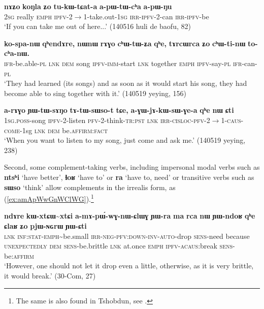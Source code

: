 \documentclass[oneside,a4paper,11pt]{article}
\newcommand{\ipa}[1]{\textbf{\phon#1}} %
\newcommand{\jpg}[2]{\ipa{#1} `#2'} %
\newcommand{\tld}{\textasciitilde{}}
\begin{document}
\begin{exe}
\ex \label{ex:tukWtɕata}
\gll 
\ipa{nɤʑo} 	\ipa{koŋla} 	\ipa{ʑo} 	\ipa{tu-kɯ-tɕat-a} 	\ipa{a-pɯ-tɯ-cʰa} 	\ipa{a-pɯ-ŋu} 	\\
\textsc{2sg} really \textsc{emph} \textsc{ipfv}-2$\rightarrow$1-take.out-\textsc{1sg} \textsc{irr-ipfv}-2-can \textsc{irr-ipfv}-be \\
\glt `If you can take me out of here...' (140516 huli de baofu, 82)
\end{exe}

\begin{exe}
\ex \label{ex:chWtinW}
\gll 
\ipa{ko-spa-nɯ} 	\ipa{qʰendɤre,} 	\ipa{nɯnɯ} 	\ipa{rɤɣo} 	\ipa{cʰɯ-tɯ-ʑa} 	\ipa{qʰe,} 	\ipa{tɤrcɯrca} 	\ipa{ʑo} 	\ipa{cʰɯ-ti-nɯ} 	\ipa{to-cʰa-nɯ.} \\
\textsc{ifr}-be.able-\textsc{pl} \textsc{lnk} \textsc{dem} song \textsc{ipfv-imm}-start \textsc{lnk} together \textsc{emph} \textsc{ipfv}-say-\textsc{pl} \textsc{ifr}-can-\textsc{pl} \\
\glt `They had learned (its songs) and as soon as it would start his song, they had become able to sing together with it.' (140519 yeying, 156)
\end{exe}

\begin{exe}
\ex \label{ex:tAtWsWsot}
\gll \ipa{a-rɤɣo} 	\ipa{ɲɯ-tɯ-sɤŋo} 	\ipa{tɤ-tɯ-sɯso-t} 	\ipa{tɕe,} 	\ipa{a-ɣɯ-jɤ-kɯ-sɯ-ɣe-a} 	\ipa{qʰe} 	\ipa{nɯ} 	\ipa{ɕti} \\
\textsc{1sg.poss}-song \textsc{ipfv}-2-listen \textsc{pfv}-2-think-\textsc{tr:pst} \textsc{lnk} \textsc{irr-cisloc-pfv-2$\rightarrow$1-caus-come}-1sg \textsc{lnk} \textsc{dem} be.\textsc{affirm:fact} \\
\glt `When you want to listen to my song, just come and ask me.' (140519 yeying, 238)
\end{exe}

Second, some complement-taking verbs, including impersonal modal verbs such as \jpg{ntsʰi}{have better}, \jpg{ɬoʁ}{have to} or \jpg{ra}{have to, need} or transitive verbs such as \jpg{sɯso}{think} allow complements in the irrealis form, as (\ref{ex:amApWwGnWClWG}).\footnote{The same is also found in Tshobdun, see \citet[483]{sun12complementation}.}

\begin{exe}
\ex \label{ex:amApWwGnWClWG}
\gll 
\ipa{ndɤre} 	\ipa{kɯ-xtɕɯ\tld{}xtɕi} 	\ipa{a-mɤ-pɯ́-wɣ-nɯ-ɕlɯɣ} 	\ipa{ɲɯ-ra} 	\ipa{ma} 	\ipa{rca} 	\ipa{nɯ} 	\ipa{ɲɯ-ndoʁ} 	\ipa{qʰe} 	\ipa{ɕlaʁ} 	\ipa{ʑo} 	\ipa{pjɯ-ɴɢrɯ} 	\ipa{ɲɯ-ɕti} \\
\textsc{lnk} \textsc{inf:stat-emph}\tld{}be.small \textsc{irr-neg-pfv:down-inv-auto}-drop \textsc{sens}-need because \textsc{unexpectedly} \textsc{dem} \textsc{sens}-be.brittle \textsc{lnk} at.once \textsc{emph} \textsc{ipfv-acaus}:break \textsc{sens}-be:\textsc{affirm} \\
\glt `However, one should not let it drop even a little, otherwise, as it is very brittle, it would break.' (30-Com, 27)
\end{exe}
\end{document}
